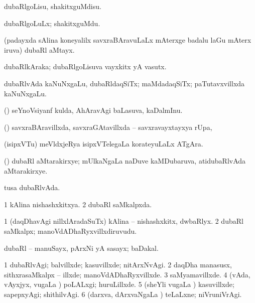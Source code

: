 {\bentry
{} 
\gl{\sakirx}
\expl{}
\bmng
dubaRlgoLisu, shakitxguMdisu. 
\emng

\noindent 
\gl{\akirx}
\expl{}
\bmng
dubaRlgoLuLx; shakitxguMdu. 
\emng
\eentry

\bentry
{} 
\gl{\nA}
\bmng
(padayxda sAlina koneyalilx savxraBAravuLaLx mAterxge badalu laGu mAterx iruva) dubaRl aMtayx. 
\emng
\eentry

\bentry
{} 
\gl{\nA}
\bmng
dubaRlkAraka; dubaRlgoLisuva vayxkitx yA vasutx. 
\emng
\eentry

\bentry
{} 
\gl{\nA}
\expl{}
\bmng
dubaRlvAda kaNuNxgaLu, dubaRldaqSiTx; maMdadaqSiTx; paTutavxvillxda kaNuNxgaLu. 
\emng
\eentry

\bentry
{} 
\gl{\nA}
\bmng
(\ame) seYnoVsiyanf kulda, AhAravAgi baLasuva, kaDalmInu. 
\emng
\eentry

\bentry
{}
\gl{\nA}
\bmng
(\vAyx) savxraBAravillxda, savxraGAtavillxda -- savxravayxtayxya rUpa, \udA\  
\emng
\eentry

\bentry
{} 
\gl{\nA}
\expl{}
\bmng
(isipxVTu) meVldxjeRya isipxVTelegaLa korateyuLaLx ATgAra. 
\emng
\eentry

\bentry
{} 
\gl{\nA}
\bmng
(\Bwvi) dubaRl aMtarakirxye; mUlkaNgaLa naDuve kaMDubaruva, atidubaRlvAda aMtarakirxye. 
\emng
\eentry

\bentry
{} 
\gl{\gu}
\expl{}
\bmng
tusa dubaRlvAda. 
\emng
\eentry

\bentry
{} 
\gl{\gu}
\expl{}
\bmng
\bnum
\num{1} kAlina nishashxkitxya. 
\num{2} dubaRl saMkalpxda. 
\enum
\emng
\eentry

\bentry
{} 
\gl{\nA}
\expl{}
\bmng
\bnum
\num{1} (daqDhavAgi nillxlAradaSuTx) kAlina -- nishashxkitx, dwbaRlyx. 
\num{2} dubaRl saMkalpx; manoVdADhaRyxvillxdiruvudu. 
\enum
\emng
\eentry

\bentry
{} 
\gl{\nA}
\expl{}
\bmng
dubaRl -- manuSayx, pArxNi yA sasayx; baDakal. 
\emng
\eentry

\bentry
{} 
\gl{\kirxvi}
\expl{}
\bmng
\bnum
\num{1} dubaRlvAgi; balvillxde; kasuvillxde; nitArxNvAgi. 
\num{2} daqDha manasusx, sithxrasaMkalpx -- illxde; manoVdADhaRyxvillxde. 
\num{3} saMyamavillxde. 
\num{4} (vAda, vAyxjyx, \mo vugaLa \vi) poLALxgi; huruLillxde. 
\num{5} (sheYli \mo vugaLa \vi) kasuvillxde; sapepxyAgi; shithilvAgi. 
\num{6} (darxva, dArxvaNgaLa \vi) teLaLxne; niVruniVrAgi. 
\enum
\emng
\eentry

}
